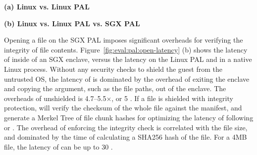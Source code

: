 \begin{figure*}[t!]
\centering
\footnotesize
{}
\parbox{0.49\textwidth}{\centering\bf (a) Linux vs. Linux PAL}
\parbox{0.49\textwidth}{\centering\bf (b) Linux vs. Linux PAL vs. SGX PAL}
\caption{Latency of  on the Linux PAL  and SGX PAL, versus  on Linux.
Lower is better.
Figure (a) compares  on the Linux PAL,
with and without a \seccomp{} filter ({\bf +SC})
and reference monitor ({\bf +RM}), against  on Linux. Figure (b) compares  on a SGX PAL,
with and without integrity checks ({\bf +CHK}),
against the Linux PAL and  on Linux.}
\label{fig:eval:pal:open-latency}
\end{figure*}


Opening a file on the SGX PAL
imposes significant overheads for verifying
the integrity of file contents.
Figure~\ref{fig:eval:pal:open-latency} (b) shows the latency of  inside of an SGX enclave, versus the latency on the Linux PAL
and in a native Linux process.
Without any security checks to shield the guest from the untrusted OS,
the latency of  is dominated by the overhead of exiting the enclave and copying the argument, such as the file paths, out of the enclave.
The overheads of unshielded  is 4.7--5.5$\times$, or \roughly{}5 \usec{}.
If a file is shielded with integrity protection,
 will verify the checksum of the whole file against the manifest, and generate a Merkel Tree of file chunk hashes
for optimizing the latency of following  or .
The overhead of enforcing the integrity check is correlated with the file size, and dominated by the time of
calculating a SHA256 hash of the file.
For a 4MB file, the latency of  can be up to \roughly{}30 \msec{}.









